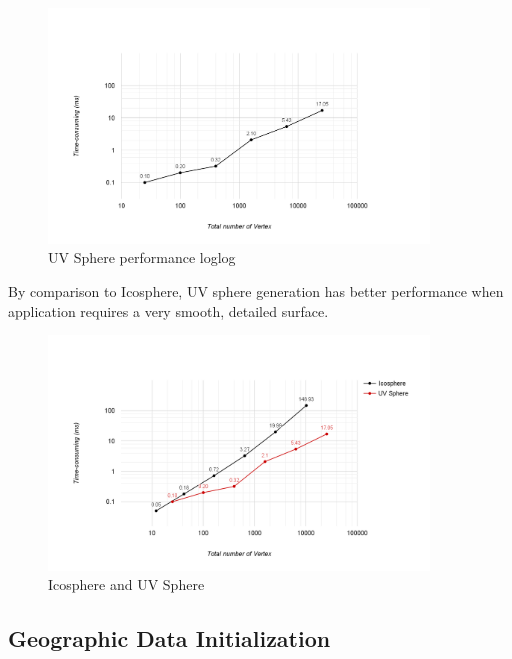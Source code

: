 \begin{figure}[H]
	\caption{UV Sphere performance loglog}
	\label{fig:uv-sphere-performance-loglog}
	\centering
	\includegraphics[width=0.9\textwidth, keepaspectratio]{Figures/uv-sphere-performance-loglog.png}
	\decoRule
\end{figure}

By comparison to Icosphere, UV sphere generation has better performance when application requires a very smooth, detailed surface.

\begin{figure}[H]
	\caption{Icosphere and UV Sphere}
	\label{fig:icosphere-and-uv-sphere}
	\centering
	\includegraphics[width=0.9\textwidth, keepaspectratio]{Figures/icosphere-and-uv-sphere.png}
	\decoRule
\end{figure}

\subsection{Geographic Data Initialization}

